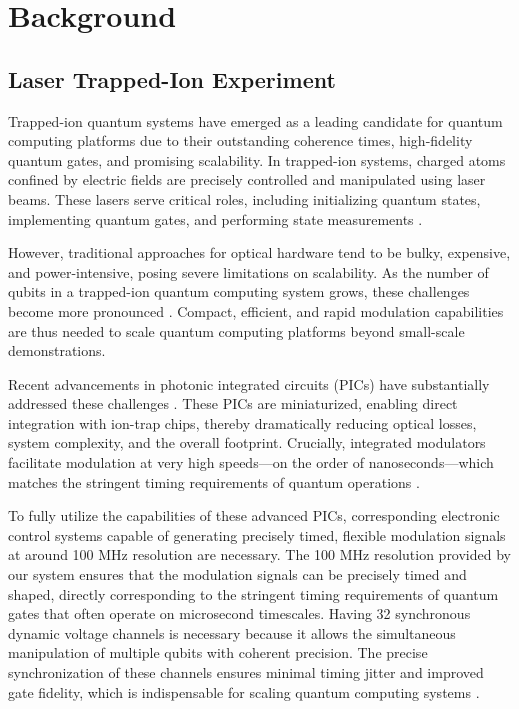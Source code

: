 \chapter{Background}

\section{Laser Trapped-Ion Experiment}

Trapped-ion quantum systems have emerged as a leading candidate for quantum computing platforms due to their outstanding coherence times, high-fidelity quantum gates, and promising scalability. In trapped-ion systems, charged atoms confined by electric fields are precisely controlled and manipulated using laser beams. These lasers serve critical roles, including initializing quantum states, implementing quantum gates, and performing state measurements \cite{naturequantuminfo}. 

However, traditional approaches for optical hardware tend to be bulky, expensive, and power-intensive, posing severe limitations on scalability. As the number of qubits in a trapped-ion quantum computing system grows, these challenges become more pronounced \cite{photonicreview}. Compact, efficient, and rapid modulation capabilities are thus needed to scale quantum computing platforms beyond small-scale demonstrations.

Recent advancements in photonic integrated circuits (PICs) have substantially addressed these challenges \cite{apic}. These PICs are miniaturized, enabling direct integration with ion-trap chips, thereby dramatically reducing optical losses, system complexity, and the overall footprint. Crucially, integrated modulators facilitate modulation at very high speeds—on the order of nanoseconds—which matches the stringent timing requirements of quantum operations \cite{naturequantuminfo}.

To fully utilize the capabilities of these advanced PICs, corresponding electronic control systems capable of generating precisely timed, flexible modulation signals at around 100 MHz resolution are necessary. The 100 MHz resolution provided by our system ensures that the modulation signals can be precisely timed and shaped, directly corresponding to the stringent timing requirements of quantum gates that often operate on microsecond timescales. Having 32 synchronous dynamic voltage channels is necessary because it allows the simultaneous manipulation of multiple qubits with coherent precision. The precise synchronization of these channels ensures minimal timing jitter and improved gate fidelity, which is indispensable for scaling quantum computing systems \cite{manychanfpgactrlsys}.

